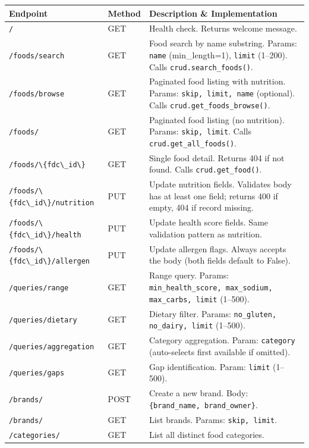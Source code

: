 \documentclass[12pt,a4paper]{article}
\begin{document}
\begin{longtable}{p{4cm}p{3cm}p{8.5cm}}
\toprule
\textbf{Endpoint} & \textbf{Method} & \textbf{Description \& Implementation} \\
\midrule
\lstinline|/| & GET & Health check. Returns welcome message. \\
\midrule
\lstinline|/foods/search| & GET & Food search by name substring. Params: \texttt{name} (min\_length=1), \texttt{limit} (1–200). Calls \texttt{crud.search\_foods()}.\\
\midrule
\lstinline|/foods/browse| & GET & Paginated food listing with nutrition. Params: \texttt{skip, limit, name} (optional). Calls \texttt{crud.get\_foods\_browse()}.\\
\midrule
\lstinline|/foods/| & GET & Paginated food listing (no nutrition). Params: \texttt{skip, limit}. Calls \texttt{crud.get\_all\_foods()}.\\
\midrule
\lstinline|/foods/\{fdc\_id\}| & GET & Single food detail. Returns 404 if not found. Calls \texttt{crud.get\_food()}.\\
\midrule
\lstinline|/foods/\{fdc\_id\}/nutrition| & PUT & Update nutrition fields. Validates body has at least one field; returns 400 if empty, 404 if record missing.\\
\midrule
\lstinline|/foods/\{fdc\_id\}/health| & PUT & Update health score fields. Same validation pattern as nutrition.\\
\midrule
\lstinline|/foods/\{fdc\_id\}/allergen| & PUT & Update allergen flags. Always accepts the body (both fields default to False).\\
\midrule
\lstinline|/queries/range| & GET & Range query. Params: \texttt{min\_health\_score, max\_sodium, max\_carbs, limit} (1–500).\\
\midrule
\lstinline|/queries/dietary| & GET & Dietary filter. Params: \texttt{no\_gluten, no\_dairy, limit} (1–500).\\
\midrule
\lstinline|/queries/aggregation| & GET & Category aggregation. Param: \texttt{category} (auto-selects first available if omitted).\\
\midrule
\lstinline|/queries/gaps| & GET & Gap identification. Param: \texttt{limit} (1–500).\\
\midrule
\lstinline|/brands/| & POST & Create a new brand. Body: \texttt{\{brand\_name, brand\_owner\}}.\\
\midrule
\lstinline|/brands/| & GET & List brands. Params: \texttt{skip, limit}.\\
\midrule
\lstinline|/categories/| & GET & List all distinct food categories.\\

\end{longtable}
\end{document}
